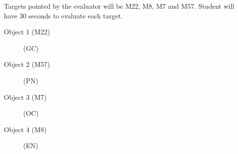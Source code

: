 Targets pointed by the evaluator will be M22, M8, M7 and M57. Student will
have 30 seconds to evaluate each target.

\begin{description}
\item[Object 1 (M22)] (GC)
\item[Object 2 (M57)] (PN)
\item[Object 3 (M7)] (OC)
\item[Object 4 (M8)] (EN)
\end{description}
